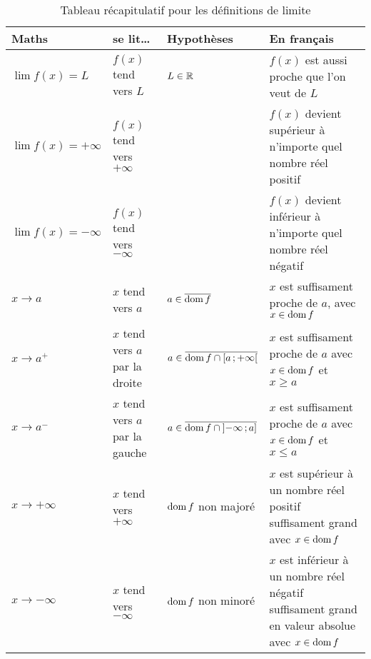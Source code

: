\documentclass[main.tex]{subfiles}
\begin{document}
\begin{sidewaystable}
    \centering
    \caption{Tableau récapitulatif pour les définitions de limite}
    \label{table:limit_definition}
    \begin{tabular}
        {l l l l}
        \toprule
        Maths & se lit\dots & Hypothèses & En français \\ \midrule
        $\lim f(x) = L$ & $f(x)$ tend vers $L$ & $L \in \mathbb{R}$ & $f(x)$ est aussi proche que l'on veut de $L$ \\
        $\lim f(x) = +\infty$ & $f(x)$ tend vers $+\infty$ & & $f(x)$ devient supérieur à n'importe quel nombre réel positif\\
        $\lim f(x) = -\infty$ & $f(x)$ tend vers $-\infty$ & & $f(x)$ devient inférieur à n'importe quel nombre réel négatif\\
        $x \to a$ & $x$ tend vers $a$ & $a \in \overline{\operatorname{dom} f}$ & $x$ est suffisament proche de $a$, avec $x \in \operatorname{dom} f$\\
        $x \to a^+$ & $x$ tend vers $a$ par la droite & $a \in \overline{\operatorname{dom} f \cap \mathopen{[}a\,;+\infty\mathclose{[}}$ & $x$ est suffisament proche de $a$ avec $x \in \operatorname{dom} f$ et $x \geq a$\\
        $x \to a^-$ & $x$ tend vers $a$ par la gauche & $a \in \overline{\operatorname{dom} f \cap \mathopen{]}-\infty\,;a\mathclose{]}}$ & $x$ est suffisament proche de $a$ avec $x \in \operatorname{dom} f$ et $x \leq a$\\
        $x \to +\infty$ & $x$ tend vers $+\infty$ & $\operatorname{dom} f$ non majoré & $x$ est supérieur à un nombre réel positif suffisament grand avec $x \in \operatorname{dom} f$\\
        $x \to -\infty$ & $x$ tend vers $-\infty$ & $\operatorname{dom} f$ non minoré & $x$ est inférieur à un nombre réel négatif suffisament grand en valeur absolue avec $x \in \operatorname{dom} f$\\
        \bottomrule
    \end{tabular}
\end{sidewaystable}
\end{document}
